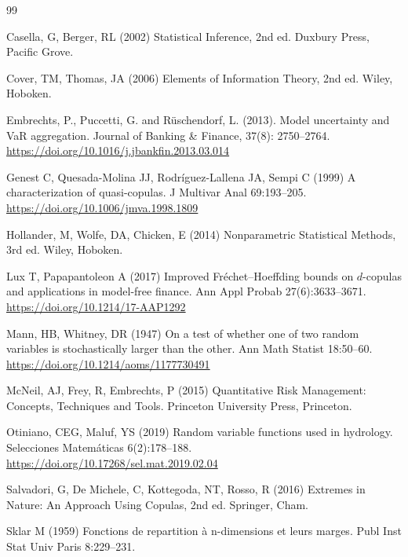 \documentclass[12pt]{article}
\begin{document}
\begin{thebibliography}{99}
%	

Casella, G, Berger, RL (2002)
{Statistical Inference}, 2nd ed.
Duxbury Press, Pacific Grove.

Cover, TM, Thomas, JA (2006)
{Elements of Information Theory}, 2nd ed.
Wiley, Hoboken.


Embrechts, P., Puccetti, G. and R{\"u}schendorf, L. (2013).
 Model uncertainty and VaR aggregation.
{Journal of Banking \& Finance}, 37(8): 2750--2764.
 \url{https://doi.org/10.1016/j.jbankfin.2013.03.014}

	Genest C, Quesada-Molina JJ, Rodr\'iguez-Lallena JA, Sempi C (1999)
	A characterization of quasi-copulas.
	J Multivar Anal 69:193--205.
	\url{https://doi.org/10.1006/jmva.1998.1809}

Hollander, M, Wolfe, DA, Chicken, E (2014)
{Nonparametric Statistical Methods}, 3rd ed.
Wiley, Hoboken.


	Lux T, Papapantoleon A (2017)
	Improved Fr\'echet--Hoeffding bounds on $d$-copulas and applications in model-free finance.
	Ann Appl Probab 27(6):3633--3671.
	\url{https://doi.org/10.1214/17-AAP1292}

Mann, HB, Whitney, DR (1947)
On a test of whether one of two random variables is stochastically larger than the other.
{Ann Math Statist} 18:50--60.
\url{https://doi.org/10.1214/aoms/1177730491}

McNeil, AJ, Frey, R, Embrechts, P (2015)
{Quantitative Risk Management: Concepts, Techniques and Tools}.
Princeton University Press, Princeton.


Otiniano, CEG, Maluf, YS (2019)
Random variable functions used in hydrology.
{Selecciones Matemáticas} 6(2):178--188.
    \url{https://doi.org/10.17268/sel.mat.2019.02.04}

Salvadori, G, De Michele, C, Kottegoda, NT, Rosso, R (2016)
{Extremes in Nature: An Approach Using Copulas}, 2nd ed.
Springer, Cham.

	Sklar M (1959)
	Fonctions de repartition \`a n-dimensions et leurs marges.
	Publ Inst Stat Univ Paris 8:229--231.

	
\end{thebibliography}
\end{document}
